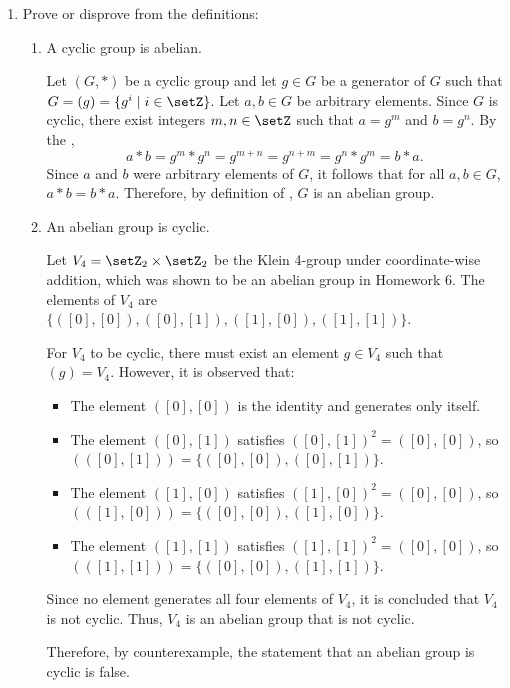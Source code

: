\begin{enumerate}
  \item Prove or disprove from the definitions:
  \begin{enumerate}
    \item A cyclic group is abelian.
    \begin{subprove}
      Let $(G, *)$ be a cyclic group and let $g \in G$ be a generator of $G$ such that $G = (g) = \{g^i \mid i \in \setZ\}$.
      Let $a, b \in G$ be arbitrary elements.
      Since $G$ is cyclic, there exist integers $m, n \in \setZ$ such that $a = g^m$ and $b = g^n$.
      By the ,
      \[
        a * b = g^m * g^n = g^{m+n} = g^{n+m} = g^n * g^m = b * a.
      \]
      Since $a$ and $b$ were arbitrary elements of $G$, it follows that for all $a, b \in G$, $a * b = b * a$.
      Therefore, by definition of , $G$ is an abelian group.
    \end{subprove}
    \item An abelian group is cyclic.
    \begin{subdisprove}
      Let $V_4 = \setZ_2 \times \setZ_2$ be the Klein 4-group under coordinate-wise addition, 
      which was shown to be an abelian group in Homework 6.
      The elements of $V_4$ are $\{([0],[0]), ([0],[1]), ([1],[0]), ([1],[1])\}$.
      
      For $V_4$ to be cyclic, there must exist an element $g \in V_4$ such that $(g) = V_4$.
      However, it is observed that:
      \begin{itemize}
        \item The element $([0],[0])$ is the identity and generates only itself.
        \item The element $([0],[1])$ satisfies $([0],[1])^2 = ([0],[0])$, so $( ([0],[1]) ) = \{([0],[0]), ([0],[1])\}$.
        \item The element $([1],[0])$ satisfies $([1],[0])^2 = ([0],[0])$, so $( ([1],[0]) ) = \{([0],[0]), ([1],[0])\}$.
        \item The element $([1],[1])$ satisfies $([1],[1])^2 = ([0],[0])$, so $( ([1],[1]) ) = \{([0],[0]), ([1],[1])\}$.
      \end{itemize}
      Since no element generates all four elements of $V_4$, it is concluded that $V_4$ is not cyclic.
      Thus, $V_4$ is an abelian group that is not cyclic.
      
      Therefore, by counterexample, the statement that an abelian group is cyclic is false.
    \end{subdisprove}
  \end{enumerate}





\end{enumerate}
